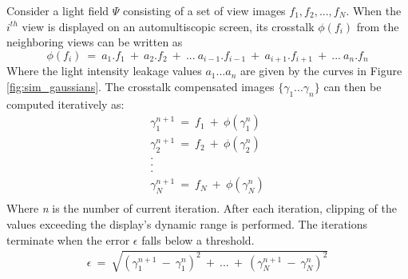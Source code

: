 Consider a light field $\Psi$ consisting of a set of view images ${f_1, f_2, ..., f_N}$. When the $i^{th}$ view is displayed on an automultiscopic screen, its crosstalk $\phi(f_i)$ from the neighboring views can be written as
\begin{equation}
\phi(f_i)\:=\: a_1.f_1\:+\:a_2.f_2\:+\:...\:a_{i-1}.f_{i-1}\:+\:a_{i+1}.f_{i+1}\:+\:...\:a_n.f_n
\end{equation}
Where the light intensity leakage values $a_1...a_n$ are given by the curves in Figure \ref{fig:sim_gaussians}. The crosstalk compensated images $\{\gamma_1...\gamma_n\}$ can then be computed iteratively as:
\begin{equation}
\begin{aligned}
\gamma_1^{n+1} \:=\: f_1 \:+\: \phi(\gamma_1^n) \\
\gamma_2^{n+1} \:=\: f_2 \:+\: \phi(\gamma_2^n) \\
.\:\:\:\:\:\:\:\:\:\:\:\:\:\:\:\:\:\:\:\:\:\:\:\:\:\:\:\:\:\:\:\:\:\:\:\:\:\ \\
.\:\:\:\:\:\:\:\:\:\:\:\:\:\:\:\:\:\:\:\:\:\:\:\:\:\:\:\:\:\:\:\:\:\:\:\:\:\ \\
.\:\:\:\:\:\:\:\:\:\:\:\:\:\:\:\:\:\:\:\:\:\:\:\:\:\:\:\:\:\:\:\:\:\:\:\:\:\ \\
\gamma_N^{n+1} \:=\: f_N \:+\: \phi(\gamma_N^n) \\
\end{aligned}
\end{equation}
Where \emph{n} is the number of current iteration. After each iteration, clipping of the values exceeding the display's dynamic range is performed. The iterations terminate when the error $\epsilon$ falls below a threshold.
\begin{equation}
\begin{aligned}
\epsilon \:=\: \sqrt{(\gamma_1^{n+1}\:-\:\gamma_1^n)^2 \:+\: ...\:+\:(\gamma_N^{n+1}\:-\:\gamma_N^n)^2}
\end{aligned}
\end{equation}


